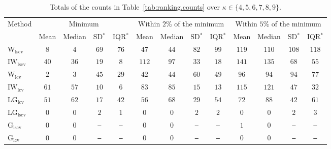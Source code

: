 \begin{table}[!htp]
\caption{Totals of the counts in Table~\ref{tab:ranking.counts} over $\kappa\in\{4,5,6,7,8,9\}$.}
\label{tab:ranking.counts.total}
\centering
\fontsize{7.9}{7}\selectfont
\setlength{\tabcolsep}{4pt}
\renewcommand{\arraystretch}{0.15}
\begin{tabular}{lcccccccccccc}
\toprule
Method & \multicolumn{4}{c}{Minimum} & \multicolumn{4}{c}{Within $2\%$ of the minimum} & \multicolumn{4}{c}{Within $5\%$ of the minimum} \\
\cmidrule(lr){2-5}\cmidrule(lr){6-9}\cmidrule(lr){10-13}
 & Mean & Median & SD$^{*}$ & IQR$^{*}$ & Mean & Median & SD$^{*}$ & IQR$^{*}$ & Mean & Median & SD$^{*}$ & IQR$^{*}$ \\
\midrule
$\mathrm{W}_{\mathrm{lscv}}$ & $8$ & $4$ & \cellcolor{black!30}$69$ & \cellcolor{black!30}$76$ & $47$ & $44$ & \cellcolor{black!30}$82$ & \cellcolor{black!30}$99$ & \cellcolor{black!10}$119$ & $110$ & \cellcolor{black!30}$108$ & \cellcolor{black!30}$118$ \\
$\mathrm{IW}_{\mathrm{lscv}}$ & $40$ & $36$ & $19$ & $8$ & \cellcolor{black!30}$112$ & \cellcolor{black!30}$97$ & $33$ & $18$ & \cellcolor{black!30}$141$ & \cellcolor{black!30}$135$ & $68$ & $55$ \\
$\mathrm{W}_{\mathrm{lcv}}$ & $2$ & $3$ & \cellcolor{black!10}$45$ & $29$ & $42$ & $44$ & \cellcolor{black!10}$60$ & $49$ & $96$ & $94$ & \cellcolor{black!10}$94$ & \cellcolor{black!10}$77$ \\
$\mathrm{IW}_{\mathrm{lcv}}$ & \cellcolor{black!30}$61$ & \cellcolor{black!10}$57$ & $10$ & $6$ & \cellcolor{black!10}$83$ & \cellcolor{black!10}$85$ & $15$ & $13$ & $115$ & \cellcolor{black!10}$121$ & $47$ & $32$ \\
$\mathrm{LG}_{\mathrm{lcv}}$ & \cellcolor{black!10}$51$ & \cellcolor{black!30}$62$ & $17$ & \cellcolor{black!10}$42$ & $56$ & $68$ & $29$ & \cellcolor{black!10}$54$ & $72$ & $88$ & $42$ & $61$ \\
$\mathrm{LG}_{\mathrm{lscv}}$ & $0$ & $0$ & $2$ & $1$ & $0$ & $0$ & $2$ & $2$ & $0$ & $0$ & $2$ & $3$ \\
$\mathrm{G}_{\mathrm{lscv}}$ & $0$ & $0$ & \texttt{---} & \texttt{---} & $0$ & $0$ & \texttt{---} & \texttt{---} & $1$ & $0$ & \texttt{---} & \texttt{---} \\
$\mathrm{G}_{\mathrm{lcv}}$ & $0$ & $0$ & \texttt{---} & \texttt{---} & $0$ & $0$ & \texttt{---} & \texttt{---} & $0$ & $0$ & \texttt{---} & \texttt{---} \\
\bottomrule
\end{tabular}
\end{table}
